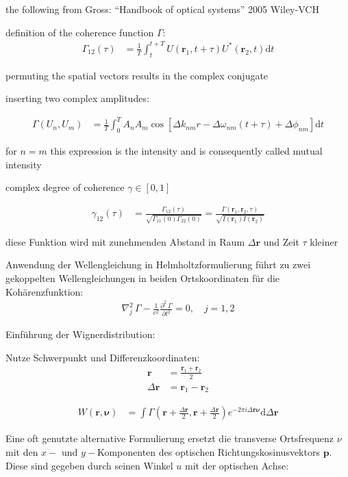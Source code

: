 \documentclass{article}
\newcommand{\vect}[1]{\mathbf{#1}}
\renewcommand{\r}{\vect r}
\newcommand{\p}{\vect p}
\newcommand{\vnu}{\boldsymbol\nu}
\begin{document}
the following from Gross: ``Handbook of optical systems'' 2005 Wiley-VCH

definition of the coherence function $\Gamma$:
\begin{align}
  \Gamma_{12}(\tau) &= \frac{1}{T}\int_t^{t+T} U(\r_1,t+\tau) U^*(\r_2,t)\textrm{d}t
\end{align}

permuting the spatial vectors results in the complex conjugate

inserting two complex amplitudes:

\begin{align}
  \Gamma(U_n, U_m) &= \frac{1}{T}\int_0^T A_n A_m \cos\left[ \Delta k_{nm} r -\Delta\omega_{nm}(t+\tau) + \Delta\phi_{nm} \right]\textrm{d}t
\end{align}

for $n=m$ this expression is the intensity and is consequently called mutual intensity

complex degree of coherence $\gamma\in[0,1]$

\begin{align}
  \gamma_{12}(\tau) &= \frac{\Gamma_{12}(\tau)}{\sqrt{\Gamma_{11}(0)\Gamma_{22}(0)}} = \frac{\Gamma(\r_1,\r_2,\tau)}{\sqrt{I(\r_1)I(\r_2)}}
\end{align}

diese Funktion wird mit zunehmenden Abstand in Raum $\Delta\r$ und Zeit $\tau$ kleiner

Anwendung der Wellengleichung in Helmholtzformulierung f\"uhrt zu zwei
gekoppelten Wellengleichungen in beiden Ortskoordinaten f\"ur die
Koh\"arenzfunktion:
\begin{align}
  \nabla_j^2\,\Gamma - \frac{1}{c^2} \frac{\partial^2\, \Gamma}{\partial t^2} = 0, \quad j=1,2
\end{align}

Einf\"uhrung der Wignerdistribution:

Nutze Schwerpunkt und Differenzkoordinaten:
\begin{align}
  \r &= \frac{\r_1+\r_2}{2} \\
  \Delta\r &= \r_1-\r_2
\end{align}


\begin{align}
  W(\r,\vnu) &= \int\Gamma\left(\r+\frac{\Delta\r}{2},\r+\frac{\Delta\r}{2}\right) e^{-2\pi i \Delta\r\vnu}\textrm{d}\Delta\r
\end{align}

Eine oft genutzte alternative Formulierung ersetzt die transverse
Ortsfrequenz $\nu$ mit den $x-$ und $y-$Komponenten des optischen
Richtungskosinusvektors $\p$. Diese sind gegeben durch seinen Winkel
$u$ mit der optischen Achse:
\end{document}
